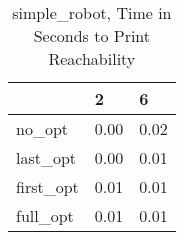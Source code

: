 \begin{table}
\caption{simple\_robot, Time in Seconds to Print Reachability}
\label{simple_robot_states_time}
\begin{tabular}{lll}
\toprule
 & 2 & 6 \\
\midrule
no\_opt & 0.00 & 0.02 \\
last\_opt & 0.00 & 0.01 \\
first\_opt & 0.01 & 0.01 \\
full\_opt & 0.01 & 0.01 \\
\bottomrule
\end{tabular}
\end{table}
